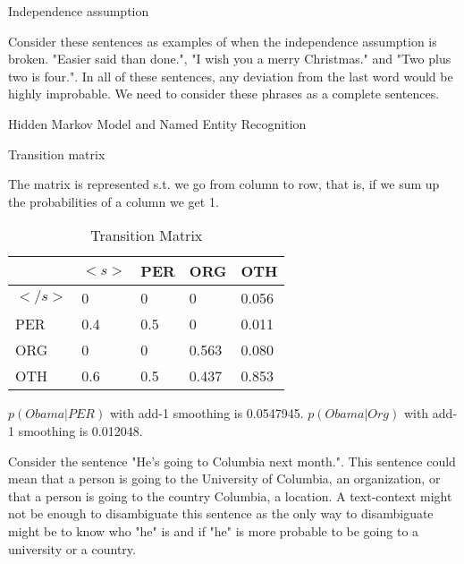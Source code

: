 \documentclass[12pt]{article}
\newenvironment{question}[2][Question]{\begin{trivlist}
\item[\hskip \labelsep {\bfseries #1}\hskip \labelsep {\bfseries #2.}]}{\end{trivlist}}
\newenvironment{answer}[2][Answer]{\begin{trivlist}
\item[\hskip \labelsep {\bfseries #1}\hskip \labelsep {\bfseries #2:}]}{\end{trivlist}}
\begin{document}
\begin{question}{2}
Independence assumption
\end{question}

\begin{answer}{a)}

Consider these sentences as examples of when the independence assumption is broken. "Easier said than done.", "I wish you a merry Christmas." and "Two plus two is four.". In all of these sentences, any deviation from the last word would be highly improbable. We need to consider these phrases as a complete sentences.
\end{answer}

\begin{question}{3}
Hidden Markov Model and Named Entity Recognition
\end{question}

\begin{answer}{a)}{Transition matrix}

The matrix is represented s.t. we go from column to row, that is, if we sum up the probabilities of a column we get 1.
\begin{table}[h!]
\centering
\caption{Transition Matrix}
\label{my-label}
\begin{tabular}{|l|l|l|l|l|}
\hline
       & $<s>$ & PER & ORG   & OTH   \\ \hline
$</s>$ & 0     & 0   & 0     & 0.056 \\ \hline
PER    & 0.4   & 0.5 & 0     & 0.011 \\ \hline
ORG    & 0     & 0   & 0.563 & 0.080 \\ \hline
OTH    & 0.6   & 0.5 & 0.437 & 0.853 \\ \hline
\end{tabular}
\end{table}
\end{answer}

\begin{answer}{b)}

$p(Obama|PER)$ with add-1 smoothing is 0.0547945. $p(Obama|Org)$ with add-1 smoothing is 0.012048.
\end{answer}

\begin{answer}{c)}

Consider the sentence "He's going to Columbia next month.". This sentence could mean that a person is going to the University of Columbia, an organization, or that a person is going to the country Columbia, a location. A text-context might not be enough to disambiguate this sentence as the only way to disambiguate might be to know who "he" is and if "he" is more probable to be going to a university or a country.
\end{answer}
\end{document}

